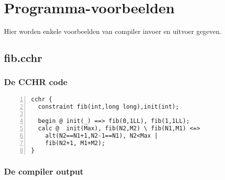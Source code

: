 \chapter{Programma-voorbeelden} \label{chap:output}

Hier worden enkele voorbeelden van compiler invoer en uitvoer gegeven.

\section{fib.cchr} \label{sec:out-fib}

\subsection{De CCHR code}

\begin{Verbatim}[frame=single,numbers=left]
cchr {
  constraint fib(int,long long),init(int);

  begin @ init(_) ==> fib(0,1LL), fib(1,1LL);
  calc @  init(Max), fib(N2,M2) \ fib(N1,M1) <=>
    alt(N2==N1+1,N2-1==N1), N2<Max |
    fib(N2+1, M1+M2);
}
\end{Verbatim}

\subsection{De compiler output}


